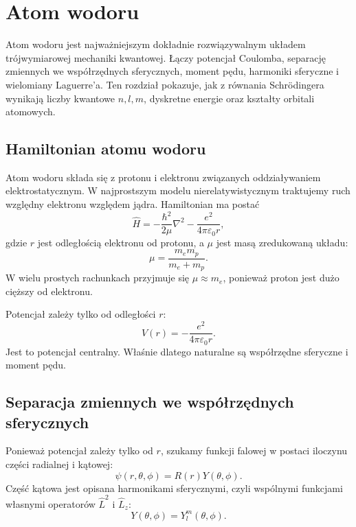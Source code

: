 \chapter{Atom wodoru}

\begin{summarybox}
Atom wodoru jest najważniejszym dokładnie rozwiązywalnym układem trójwymiarowej
mechaniki kwantowej. Łączy potencjał Coulomba, separację zmiennych we
współrzędnych sferycznych, moment pędu, harmoniki sferyczne i wielomiany
Laguerre'a. Ten rozdział pokazuje, jak z równania Schrödingera wynikają liczby
kwantowe \(n,l,m\), dyskretne energie oraz kształty orbitali atomowych.
\end{summarybox}

\section{Hamiltonian atomu wodoru}

Atom wodoru składa się z protonu i elektronu związanych oddziaływaniem elektrostatycznym. W najprostszym modelu nierelatywistycznym traktujemy ruch względny elektronu względem jądra. Hamiltonian ma postać
\begin{equation}
    \hat{H}= -\frac{\hbar^2}{2\mu}\nabla^2
    -\frac{e^2}{4\pi\varepsilon_0 r},
\end{equation}
gdzie \(r\) jest odległością elektronu od protonu, a \(\mu\) jest masą zredukowaną układu:
\begin{equation}
    \mu=\frac{m_e m_p}{m_e+m_p}.
\end{equation}
W wielu prostych rachunkach przyjmuje się \(\mu\approx m_e\), ponieważ proton jest dużo cięższy od elektronu.

Potencjał zależy tylko od odległości \(r\):
\begin{equation}
    V(r)=-\frac{e^2}{4\pi\varepsilon_0 r}.
\end{equation}
Jest to potencjał centralny. Właśnie dlatego naturalne są współrzędne sferyczne i moment pędu.

\section{Separacja zmiennych we współrzędnych sferycznych}

Ponieważ potencjał zależy tylko od \(r\), szukamy funkcji falowej w postaci iloczynu części radialnej i kątowej:
\begin{equation}
    \psi(r,\theta,\phi)=R(r)Y(\theta,\phi).
\end{equation}
Część kątowa jest opisana harmonikami sferycznymi, czyli wspólnymi funkcjami własnymi operatorów \(\hat{L}^2\) i \(\hat{L}_z\):
\begin{equation}
    Y(\theta,\phi)=Y_l^m(\theta,\phi).
\end{equation}

